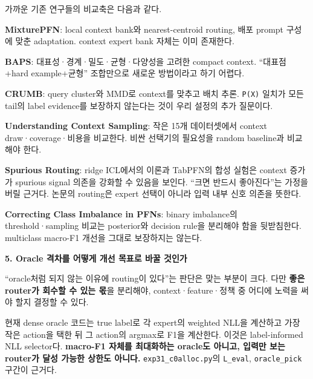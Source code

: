 가까운 기존 연구들의 비교축은 다음과 같다.

\par\noindent \textbullet\enspace \textbf{MixturePFN}: local context bank와 nearest-centroid routing, 배포 prompt 구성에 맞춘 adaptation. context expert bank 자체는 이미 존재한다.


\par\noindent \textbullet\enspace \textbf{BAPS}: 대표성·경계·밀도·균형·다양성을 고려한 compact context. “대표점+\allowbreak{}hard example+\allowbreak{}균형” 조합만으로 새로운 방법이라고 하기 어렵다.


\par\noindent \textbullet\enspace \textbf{CRUMB}: query cluster와 MMD로 context를 맞추고 배치 추론. \texttt{P(X)} 일치가 모든 tail의 label evidence를 보장하지 않는다는 것이 우리 설정의 추가 질문이다.


\par\noindent \textbullet\enspace \textbf{Understanding Context Sampling}: 작은 15개 데이터셋에서 context draw·coverage·비용을 비교한다. 비싼 선택기의 필요성을 random baseline과 비교해야 한다.


\par\noindent \textbullet\enspace \textbf{Spurious Routing}: ridge ICL에서의 이론과 TabPFN의 합성 실험은 context 증가가 spurious signal 의존을 강화할 수 있음을 보인다. “크면 반드시 좋아진다”는 가정을 버릴 근거다. 논문의 routing은 expert 선택이 아니라 입력 내부 신호 의존을 뜻한다.


\par\noindent \textbullet\enspace \textbf{Correcting Class Imbalance in PFNs}: binary imbalance의 threshold·sampling 비교는 posterior와 decision rule을 분리해야 함을 뒷받침한다. multiclass macro-F1 개선을 그대로 보장하지는 않는다.


\textbf{5. Oracle 격차를 어떻게 개선 목표로 바꿀 것인가}

“oracle처럼 되지 않는 이유에 routing이 있다”는 판단은 맞는 부분이 크다. 다만 \textbf{좋은 router가 회수할 수 있는 몫}을 분리해야, context·feature·정책 중 어디에 노력을 써야 할지 결정할 수 있다.

현재 dense oracle 코드는 true label로 각 expert의 weighted NLL을 계산하고 가장 작은 action을 택한 뒤 그 action의 argmax로 F1을 계산한다. 이것은 label-informed NLL selector다. \textbf{macro-F1 자체를 최대화하는 oracle도 아니고, 입력만 보는 router가 달성 가능한 상한도 아니다.} \texttt{exp31\_\allowbreak{}\allowbreak{}c0\allowbreak{}alloc.\allowbreak{}py\allowbreak{}}의 \texttt{L\_\allowbreak{}\allowbreak{}eval}, \texttt{oracle\_\allowbreak{}\allowbreak{}p\allowbreak{}ick} 구간이 근거다.

